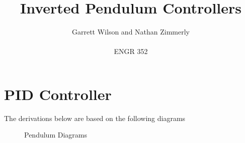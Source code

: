 \documentclass{article}
\begin{document}
\title{Inverted Pendulum Controllers}
\author{Garrett Wilson and Nathan Zimmerly \\ \\
ENGR 352}
\maketitle

\clearpage
\tableofcontents
\pagebreak

\section{PID Controller}
The derivations below are based on the following diagrams

\begin{figure}[H]
\centering
{}
\caption{Pendulum Diagrams}
\end{figure}
\end{document}
